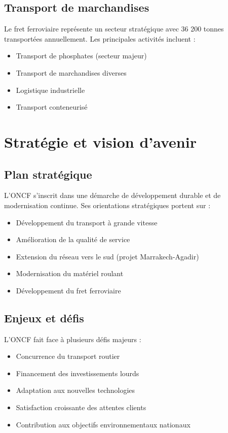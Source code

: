 \subsection{Transport de marchandises}

Le fret ferroviaire représente un secteur stratégique avec 36 200 tonnes transportées annuellement. Les principales activités incluent :
\begin{itemize}
    \item Transport de phosphates (secteur majeur)
    \item Transport de marchandises diverses
    \item Logistique industrielle
    \item Transport conteneurisé
\end{itemize}

\section{Stratégie et vision d'avenir}

\subsection{Plan stratégique}

L'ONCF s'inscrit dans une démarche de développement durable et de modernisation continue. Ses orientations stratégiques portent sur :
\begin{itemize}
    \item Développement du transport à grande vitesse
    \item Amélioration de la qualité de service
    \item Extension du réseau vers le sud (projet Marrakech-Agadir)
    \item Modernisation du matériel roulant
    \item Développement du fret ferroviaire
\end{itemize}

\subsection{Enjeux et défis}

L'ONCF fait face à plusieurs défis majeurs :
\begin{itemize}
    \item Concurrence du transport routier
    \item Financement des investissements lourds
    \item Adaptation aux nouvelles technologies
    \item Satisfaction croissante des attentes clients
    \item Contribution aux objectifs environnementaux nationaux
\end{itemize}

